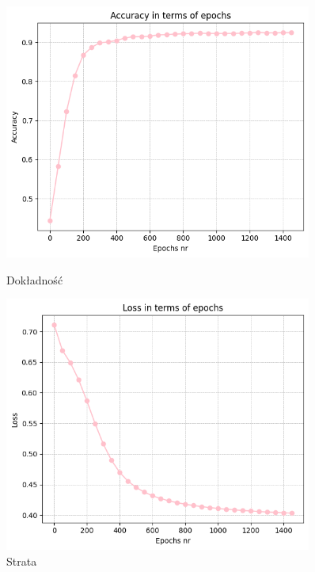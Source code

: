 \documentclass[polish,12pt,a4paper]{extarticle}
\begin{document}
\begin{figure}[h!]
    \centering
    \begin{minipage}[b]{0.48\textwidth}
    \includegraphics[width=0.9\textwidth]{img/neural_accuracy.png}
    \caption{Dokładność}
    \end{minipage}
     \hspace{0.02\textwidth}
    \begin{minipage}[b]{0.48\textwidth}
    \includegraphics[width=0.9\textwidth]{img/neural_loss.png}
    \caption{Strata}
    \end{minipage}
\end{figure}
\FloatBarrier
\end{document}
